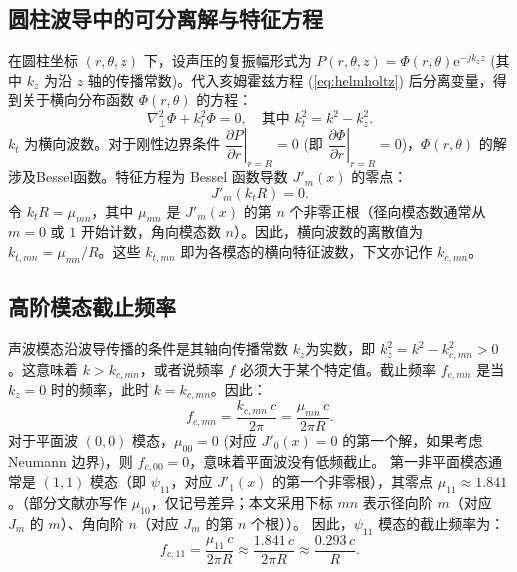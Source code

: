 \documentclass[12pt,a4paper]{article}
\begin{document}
\subsection{圆柱波导中的可分离解与特征方程}
在圆柱坐标 $(r,\theta,z)$ 下，设声压的复振幅形式为 $P(r,\theta,z)=\Phi(r,\theta)\mathrm{e}^{-jk_z z}$ (其中 $k_z$ 为沿 $z$ 轴的传播常数)。代入亥姆霍兹方程 (\ref{eq:helmholtz}) 后分离变量，得到关于横向分布函数 $\Phi(r,\theta)$ 的方程：
\begin{equation}
    \nabla_{\perp}^{2}\Phi + k_t^{2}\Phi = 0, \quad \text{其中 } k_t^2 = k^2 - k_z^2.
    \label{eq:transverse_helmholtz}
\end{equation}
$k_t$ 为横向波数。对于刚性边界条件 $\left.\dfrac{\partial P}{\partial r}\right|_{r=R}=0$ (即 $\left.\dfrac{\partial \Phi}{\partial r}\right|_{r=R}=0$)，$\Phi(r,\theta)$ 的解涉及Bessel函数。特征方程为 Bessel 函数导数 $J'_m(x)$ 的零点：
\begin{equation}
    J'_{m}\!(k_t R)=0.
    \label{eq:bessel_zeros_condition}
\end{equation}
令 $k_t R = \mu_{mn}$，其中 $\mu_{mn}$ 是 $J'_m(x)$ 的第 $n$ 个非零正根（径向模态数通常从 $m=0$ 或 $1$ 开始计数，角向模态数 $n$）。因此，横向波数的离散值为 $k_{t,mn} = \mu_{mn}/R$。这些 $k_{t,mn}$ 即为各模态的横向特征波数，下文亦记作 $k_{c,mn}$。

\subsection{高阶模态截止频率}
声波模态沿波导传播的条件是其轴向传播常数 $k_z$为实数，即 $k_z^2 = k^2 - k_{c,mn}^2 > 0$。这意味着 $k > k_{c,mn}$，或者说频率 $f$ 必须大于某个特定值。截止频率 $f_{c,mn}$ 是当 $k_z=0$ 时的频率，此时 $k = k_{c,mn}$。因此：
\begin{equation}\label{eq:fc}
    f_{c,mn}= \frac{k_{c,mn}\,c}{2\pi} = \frac{\mu_{mn}\,c}{2\pi R}.
\end{equation}
对于平面波 $(0,0)$ 模态，$\mu_{00}=0$ (对应 $J'_0(x)=0$ 的第一个解，如果考虑 Neumann 边界)，则 $f_{c,00}=0$，意味着平面波没有低频截止。
第一非平面模态通常是 $(1,1)$ 模态（即 $\psi_{11}$，对应 $J'_1(x)$ 的第一个非零根），其零点 $\mu_{11}\approx1.841$。（部分文献亦写作 $\mu_{10}$，仅记号差异；本文采用下标 $mn$ 表示径向阶 $m$（对应 $J_m$ 的 $m$）、角向阶 $n$（对应 $J_m$ 的第 $n$ 个根））。
因此，$\psi_{11}$ 模态的截止频率为：
\begin{equation}\label{eq:fc_11_specific}
    f_{c,11}= \frac{\mu_{11}\,c}{2\pi R} \approx \frac{1.841\,c}{2\pi R} \approx \frac{0.293\,c}{R}.
\end{equation}
\end{document}
